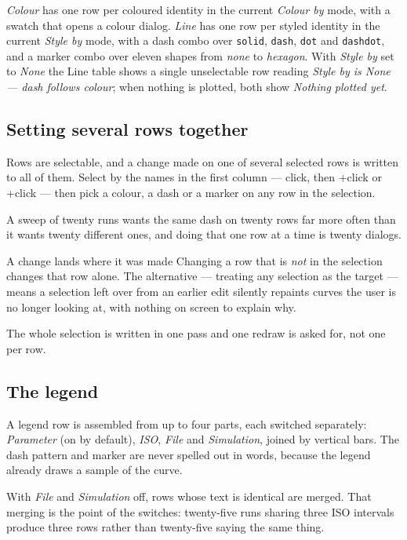 \documentclass[11pt,a4paper,oneside]{report}
\newcommand{\code}[1]{\texttt{#1}}
\newcommand{\key}[1]{\textsf{\small\fbox{#1}}}
\begin{document}
\emph{Colour} has one row per coloured identity in the current \emph{Colour by}
mode, with a swatch that opens a colour dialog. \emph{Line} has one row per
styled identity in the current \emph{Style by} mode, with a dash combo over
\code{solid}, \code{dash}, \code{dot} and \code{dashdot}, and a marker combo over
eleven shapes from \emph{none} to \emph{hexagon}. With \emph{Style by} set to
\emph{None} the Line table shows a single unselectable row reading \emph{Style by
is None --- dash follows colour}; when nothing is plotted, both show
\emph{Nothing plotted yet}.

\subsection{Setting several rows together}

Rows are selectable, and a change made on one of several selected rows is
written to all of them. Select by the names in the first column --- click,
then \key{Ctrl}+click or \key{Shift}+click --- then pick a colour, a dash or a
marker on any row in the selection.

A sweep of twenty runs wants the same dash on twenty rows far more often than
it wants twenty different ones, and doing that one row at a time is twenty
dialogs.

\begin{aoenote}{A change lands where it was made}
Changing a row that is \emph{not} in the selection changes that row alone. The
alternative --- treating any selection as the target --- means a selection
left over from an earlier edit silently repaints curves the user is no longer
looking at, with nothing on screen to explain why.

The whole selection is written in one pass and one redraw is asked for, not
one per row.
\end{aoenote}

\subsection{The legend}
\label{sec:legend}

A legend row is assembled from up to four parts, each switched separately:
\emph{Parameter} (on by default), \emph{ISO}, \emph{File} and \emph{Simulation},
joined by vertical bars. The dash pattern and marker are never spelled out in
words, because the legend already draws a sample of the curve.

With \emph{File} and \emph{Simulation} off, rows whose text is identical are
merged. That merging is the point of the switches: twenty-five runs sharing three
ISO intervals produce three rows rather than twenty-five saying the same thing.
\end{document}
